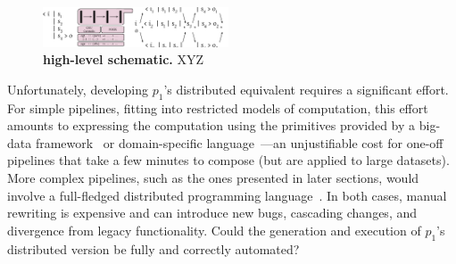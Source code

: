 \documentclass[sigplan,10pt,review,anonymous]{acmart}
\newcommand{\eg}{{\em e.g.}, }
\newcommand{\ttt}[1]{\texttt{\small #1}}
\begin{document}

\begin{figure}[t]
\centering
\includegraphics[width=0.49\textwidth]{./figs/dish_schematic.pdf}
\caption{
  \textbf{\sys high-level schematic.}
	\sys XYZ
}
\label{fig:schematic}
\end{figure}



Unfortunately, developing $p_1$'s distributed equivalent requires a significant effort.
For simple pipelines, fitting into restricted models of computation, this effort amounts to expressing the computation using the primitives provided by a big-data framework~\cite{mapreduce:08, ciel:11, spark:12, naiad:13} or domain-specific language~\cite{alvaro2011consistency, distal:13, meiklejohn2015lasp}---an unjustifiable cost for one-off pipelines that take a few minutes to compose (but are applied to large datasets).
More complex pipelines, such as the ones presented in later sections, would involve a full-fledged distributed programming language~\cite{erlang:96, lopes1997d, acute:05, mace:07, cloudhaskell:11, ScalaLoci:18}. %
In both cases, manual rewriting is expensive and can introduce new bugs, cascading changes, and divergence from legacy functionality.
Could the generation and execution of $p_1$'s distributed version be fully and correctly automated?
\end{document}
